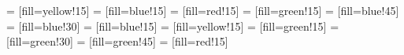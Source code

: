 \documentclass[9pt]{scrartcl}
\begin{document}

	\newcommand{\NaturalElementTextFormat}[7]
	{
    \begin{minipage}{22mm}%
    \centering%
    \par\noindent\parbox[t]{.333\textwidth}{\raggedright\textsf{#1}}%
    \parbox[t]{.333\textwidth}{\centering\textsf{#7}}%
    \parbox[t]{.333\textwidth}{\raggedleft \textsf{#2\textit{#3}}}\par%
    \vspace*{0.5em}%
    {\Huge\textbf{#5}}\\%
    \vspace*{0.14em}%
    \Large{#6}\\%
    \small{#4}
    \end{minipage}
	}
	
	 = [fill=yellow!15]
	 = [fill=blue!15]
	 = [fill=red!15]
	 = [fill=green!15]
   = [fill=blue!45]
   = [fill=blue!30]
   = [fill=blue!15]
   = [fill=yellow!15]
   = [fill=green!15]
   = [fill=green!30]
   = [fill=green!45]
   = [fill=red!15]

  \title{\vspace{-0.5cm}\doctitle}
  \subtitle{\docsubtitle}
  \date{}
	\maketitle
\end{document}
